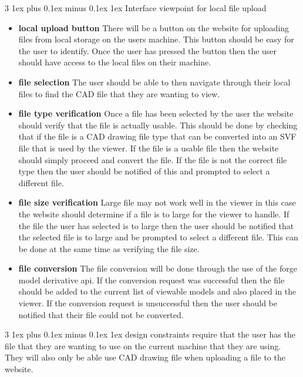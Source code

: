 \documentclass[letterpaper, 10pt, draftclsnofoot, compsoc, onecolumn]{IEEEtran}
\makeatletter
\def\subsubsection{\@startsection{subsubsection}%
                                 {3}%
                                 {\z@}%
                                 {1ex plus 0.1ex minus 0.1ex}%
                                 {1ex}%
                                 {\normalfont\normalsize}}%
\makeatother
\begin{document}
\subsubsection{Interface viewpoint for local file upload}
\begin{itemize}
	\item[]\textbf{local upload button} There will be a button on the website for uploading files from local storage on the users machine. This button should be easy for the user to identify. Once the user has pressed the button then the user should have access to the local files on their machine.
	\item[]\textbf{file selection} The user should be able to then navigate through their local files to find the CAD file that they are wanting to view.
	\item[]\textbf{file type verification} Once a file has been selected by the user the website should verify that the file is actually usable. This should be done by checking that if the file is a CAD drawing file type that can be converted into an SVF file that is used by the viewer. If the file is a usable file then the website 			should simply proceed and convert the file. If the file is not the correct file type then the user should be notified of this and prompted to select a different file.  
	\item[]\textbf{file size verification} Large file may not work well in the viewer in this case the website should determine if a file is to large for the viewer to handle. If the file the user has selected is to large then the user should be notified that the selected file is to large and be prompted to select a different file.
	This can be done at the same time as verifying the file size.
	\item[]\textbf{file conversion} The file conversion will be done through the use of the forge model derivative api. If the conversion request was successful then the file should be added to the current list of viewable models and also placed in the viewer. If the conversion request is unsuccessful then the user should
	 be notified that their file could not be converted. 
\end{itemize}

\subsubsection{design constraints} require that the user has the file that they are wanting to use on the current machine that they are using. They will also only be able use CAD drawing file when uploading a file to the website.  
\end{document}

